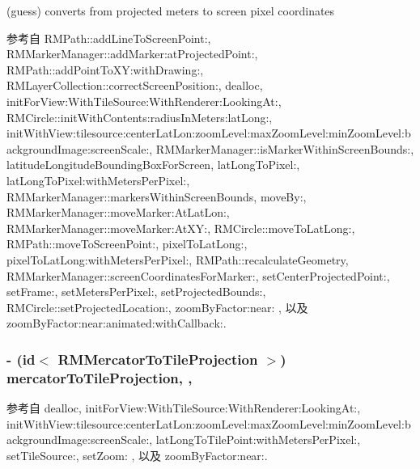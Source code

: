 (guess) converts from projected meters to screen pixel coordinates 



参考自 R\-M\-Path\-::add\-Line\-To\-Screen\-Point\-:, R\-M\-Marker\-Manager\-::add\-Marker\-:at\-Projected\-Point\-:, R\-M\-Path\-::add\-Point\-To\-X\-Y\-:with\-Drawing\-:, R\-M\-Layer\-Collection\-::correct\-Screen\-Position\-:, dealloc, init\-For\-View\-:\-With\-Tile\-Source\-:\-With\-Renderer\-:\-Looking\-At\-:, R\-M\-Circle\-::init\-With\-Contents\-:radius\-In\-Meters\-:lat\-Long\-:, init\-With\-View\-:tilesource\-:center\-Lat\-Lon\-:zoom\-Level\-:max\-Zoom\-Level\-:min\-Zoom\-Level\-:background\-Image\-:screen\-Scale\-:, R\-M\-Marker\-Manager\-::is\-Marker\-Within\-Screen\-Bounds\-:, latitude\-Longitude\-Bounding\-Box\-For\-Screen, lat\-Long\-To\-Pixel\-:, lat\-Long\-To\-Pixel\-:with\-Meters\-Per\-Pixel\-:, R\-M\-Marker\-Manager\-::markers\-Within\-Screen\-Bounds, move\-By\-:, R\-M\-Marker\-Manager\-::move\-Marker\-:\-At\-Lat\-Lon\-:, R\-M\-Marker\-Manager\-::move\-Marker\-:\-At\-X\-Y\-:, R\-M\-Circle\-::move\-To\-Lat\-Long\-:, R\-M\-Path\-::move\-To\-Screen\-Point\-:, pixel\-To\-Lat\-Long\-:, pixel\-To\-Lat\-Long\-:with\-Meters\-Per\-Pixel\-:, R\-M\-Path\-::recalculate\-Geometry, R\-M\-Marker\-Manager\-::screen\-Coordinates\-For\-Marker\-:, set\-Center\-Projected\-Point\-:, set\-Frame\-:, set\-Meters\-Per\-Pixel\-:, set\-Projected\-Bounds\-:, R\-M\-Circle\-::set\-Projected\-Location\-:, zoom\-By\-Factor\-:near\-: , 以及 zoom\-By\-Factor\-:near\-:animated\-:with\-Callback\-:.

\hypertarget{interface_r_m_map_contents_a3e7903c036affb0241bc13e128574073}{
\subsubsection[{mercator\-To\-Tile\-Projection}]{\setlength{\rightskip}{0pt plus 5cm}-\/ (id$<$ {\bf R\-M\-Mercator\-To\-Tile\-Projection} $>$) mercator\-To\-Tile\-Projection\hspace{0.3cm}{\ttfamily [read]}, {\ttfamily [atomic]}, {\ttfamily [assign]}}}\label{interface_r_m_map_contents_a3e7903c036affb0241bc13e128574073}


参考自 dealloc, init\-For\-View\-:\-With\-Tile\-Source\-:\-With\-Renderer\-:\-Looking\-At\-:, init\-With\-View\-:tilesource\-:center\-Lat\-Lon\-:zoom\-Level\-:max\-Zoom\-Level\-:min\-Zoom\-Level\-:background\-Image\-:screen\-Scale\-:, lat\-Long\-To\-Tile\-Point\-:with\-Meters\-Per\-Pixel\-:, set\-Tile\-Source\-:, set\-Zoom\-: , 以及 zoom\-By\-Factor\-:near\-:.

